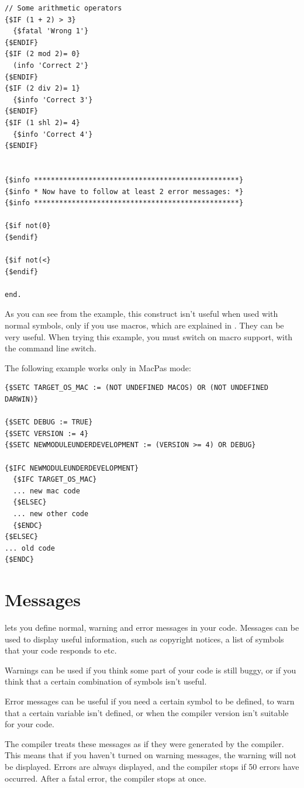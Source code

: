\begin{verbatim}
// Some arithmetic operators
{$IF (1 + 2) > 3}
  {$fatal 'Wrong 1'}
{$ENDIF}
{$IF (2 mod 2)= 0}
  (info 'Correct 2'}
{$ENDIF}
{$IF (2 div 2)= 1}
  {$info 'Correct 3'}
{$ENDIF}
{$IF (1 shl 2)= 4}
  {$info 'Correct 4'}
{$ENDIF}


{$info *************************************************}
{$info * Now have to follow at least 2 error messages: *}
{$info *************************************************}

{$if not(0}
{$endif}

{$if not(<}
{$endif}

end.
\end{verbatim}
As you can see from the example, this construct isn't useful when used
with normal symbols, only if you use macros, which are explained in
. They can be very useful. When trying this example, you must
switch on macro support, with the  command line switch.

The following example works only in MacPas mode:
\begin{verbatim}
{$SETC TARGET_OS_MAC := (NOT UNDEFINED MACOS) OR (NOT UNDEFINED DARWIN)}

{$SETC DEBUG := TRUE}
{$SETC VERSION := 4}
{$SETC NEWMODULEUNDERDEVELOPMENT := (VERSION >= 4) OR DEBUG}

{$IFC NEWMODULEUNDERDEVELOPMENT}
  {$IFC TARGET_OS_MAC}
  ... new mac code
  {$ELSEC}
  ... new other code
  {$ENDC}
{$ELSEC}
... old code
{$ENDC}
\end{verbatim}

\section{Messages}
\label{se:Messages}
\fpc lets you define normal, warning and error messages in your code.
Messages can be used to display useful information, such as copyright
notices, a list of symbols that your code responds to etc.

Warnings can be used if you think some part of your code is still buggy, or
if you think that a certain combination of symbols isn't useful.

Error messages can be useful if you need a certain symbol to be defined,
to warn that a certain variable isn't defined, or when the compiler
version isn't suitable for your code.

The compiler treats these messages as if they were generated by the
compiler. This means that if you haven't turned on warning messages, the
warning will not be displayed. Errors are always displayed, and the
compiler stops if 50 errors have occurred. After a fatal error, the compiler
stops at once.

